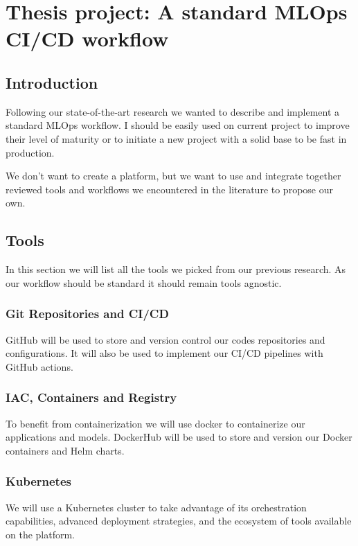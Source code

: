 \chapter{Thesis project: A standard MLOps CI/CD workflow}\label{ch:thesis-project:-a-standard-mlops-ci/cd-workflow}
\section{Introduction}\label{sec:introduction}
Following our state-of-the-art research we wanted to describe and implement a standard MLOps workflow.
I should be easily used on current project to improve their level of maturity or to initiate a new project with a solid
base to be fast in production.

We don't want to create a platform, but we want to use and integrate together reviewed
tools and workflows we encountered in the literature to propose our own.

\section{Tools}\label{sec:tools2}
In this section we will list all the tools we picked from our previous research.
As our workflow should be standard it should remain tools agnostic.

\subsection{Git Repositories and CI/CD}\label{subsec:github}
GitHub will be used to store and version control our codes repositories and configurations.
It will also be used to implement our CI/CD pipelines with GitHub actions.

\subsection{IAC, Containers and Registry}\label{subsec:dockerhub}
To benefit from containerization we will use docker to containerize our applications and models.
DockerHub will be used to store and version our Docker containers and Helm charts.

\subsection{Kubernetes}\label{subsec:kubernetes}
We will use a Kubernetes cluster to take advantage of its orchestration capabilities, advanced deployment strategies,
and the ecosystem of tools available on the platform.

